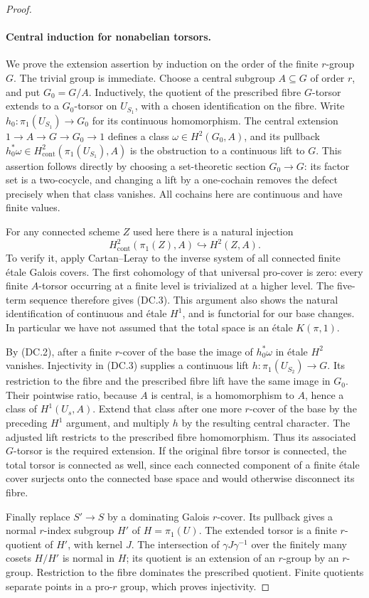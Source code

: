 \begin{proof}
\paragraph{Central induction for nonabelian torsors.}
We prove the extension assertion by induction on the order of the finite
$r$-group $G$. The trivial group is immediate. Choose a central
subgroup $A\subseteq G$ of order $r$, and put $G_0=G/A$.
Inductively, the quotient of the prescribed fibre $G$-torsor extends to
a $G_0$-torsor on $U_{S_1}$, with a chosen identification on the fibre.
Write $h_0:\pi_1(U_{S_1})\to G_0$ for its continuous homomorphism.
The central extension $1\to A\to G\to G_0\to1$ defines a class
$\omega\in H^2(G_0,A)$, and its pullback
$h_0^*\omega\in H^2_{\mathrm{cont}}(\pi_1(U_{S_1}),A)$ is the
obstruction to a continuous lift to $G$. This assertion follows
directly by choosing a set-theoretic section $G_0\to G$: its factor
set is a two-cocycle, and changing a lift by a one-cochain removes the
defect precisely when that class vanishes. All cochains here are
continuous and have finite values.

For any connected scheme $Z$ used here there is a natural injection
\[
 H^2_{\mathrm{cont}}(\pi_1(Z),A)\hookrightarrow H^2(Z,A).         \tag{DC.3}
\]
To verify it, apply Cartan--Leray to the inverse system of all connected
finite \'etale Galois covers. The first cohomology of that universal
pro-cover is zero: every finite $A$-torsor occurring at a finite level
is trivialized at a higher level. The five-term sequence therefore
gives (DC.3). This argument also shows the natural identification of
continuous and \'etale $H^1$, and is functorial for our base changes.
In particular we have not assumed that the total space is an \'etale
$K(\pi,1)$.

By (DC.2), after a finite $r$-cover of the base the image of
$h_0^*\omega$ in \'etale $H^2$ vanishes. Injectivity in (DC.3) supplies
a continuous lift $h:\pi_1(U_{S_2})\to G$. Its restriction to the
fibre and the prescribed fibre lift have the same image in $G_0$.
Their pointwise ratio, because $A$ is central, is a homomorphism to
$A$, hence a class of $H^1(U_s,A)$. Extend that class after one more
$r$-cover of the base by the preceding $H^1$ argument, and multiply
$h$ by the resulting central character. The adjusted lift restricts
to the prescribed fibre homomorphism. Thus its associated $G$-torsor
is the required extension. If the original fibre torsor is connected,
the total torsor is connected as well, since each connected component
of a finite \'etale cover surjects onto the connected base space and
would otherwise disconnect its fibre.

Finally replace $S'\to S$ by a dominating Galois $r$-cover.
Its pullback gives a normal $r$-index subgroup $H'$ of $H=\pi_1(U)$.
The extended torsor is a finite $r$-quotient of $H'$, with kernel $J$.
The intersection of $\gamma J\gamma^{-1}$ over the finitely many
cosets $H/H'$ is normal in $H$; its quotient is an extension of an
$r$-group by an $r$-group. Restriction to the fibre dominates the
prescribed quotient. Finite quotients separate points in a pro-$r$
group, which proves injectivity.
\end{proof}

